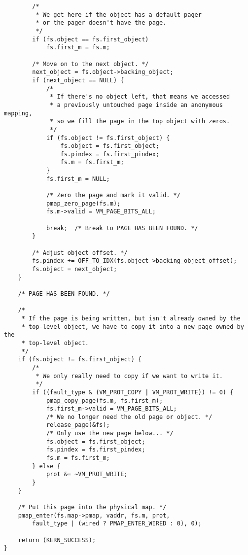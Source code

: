 \documentclass[shortabstract, english]{iithesis}
\newenvironment{code}{}{}
\begin{document}
\begin{code}
\begin{verbatim}
        /*
         * We get here if the object has a default pager
         * or the pager doesn't have the page.
         */
        if (fs.object == fs.first_object)
            fs.first_m = fs.m;

        /* Move on to the next object. */
        next_object = fs.object->backing_object;
        if (next_object == NULL) {
            /*
             * If there's no object left, that means we accessed
             * a previously untouched page inside an anonymous mapping,
             * so we fill the page in the top object with zeros.
             */
            if (fs.object != fs.first_object) {
                fs.object = fs.first_object;
                fs.pindex = fs.first_pindex;
                fs.m = fs.first_m;
            }
            fs.first_m = NULL;

            /* Zero the page and mark it valid. */
            pmap_zero_page(fs.m);
            fs.m->valid = VM_PAGE_BITS_ALL;

            break;  /* Break to PAGE HAS BEEN FOUND. */
        }

        /* Adjust object offset. */
        fs.pindex += OFF_TO_IDX(fs.object->backing_object_offset);
        fs.object = next_object;
    }

    /* PAGE HAS BEEN FOUND. */

    /*
     * If the page is being written, but isn't already owned by the
     * top-level object, we have to copy it into a new page owned by the
     * top-level object.
     */
    if (fs.object != fs.first_object) {
        /*
         * We only really need to copy if we want to write it.
         */
        if ((fault_type & (VM_PROT_COPY | VM_PROT_WRITE)) != 0) {
            pmap_copy_page(fs.m, fs.first_m);
            fs.first_m->valid = VM_PAGE_BITS_ALL;
            /* We no longer need the old page or object. */
            release_page(&fs);
            /* Only use the new page below... */
            fs.object = fs.first_object;
            fs.pindex = fs.first_pindex;
            fs.m = fs.first_m;
        } else {
            prot &= ~VM_PROT_WRITE;
        }
    }

    /* Put this page into the physical map. */
    pmap_enter(fs.map->pmap, vaddr, fs.m, prot,
        fault_type | (wired ? PMAP_ENTER_WIRED : 0), 0);

    return (KERN_SUCCESS);
}
\end{verbatim}
\end{code}
\end{document}
